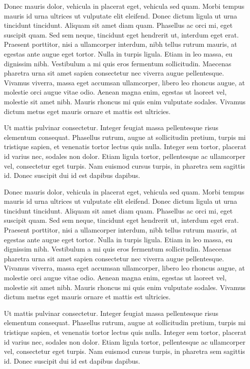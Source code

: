 \documentclass{FramateX}
\begin{document}
Donec mauris dolor, vehicula in placerat eget, vehicula sed quam. Morbi tempus mauris id urna ultrices ut vulputate elit eleifend. Donec dictum ligula ut urna tincidunt tincidunt. Aliquam sit amet diam quam. Phasellus ac orci mi, eget suscipit quam. Sed sem neque, tincidunt eget hendrerit ut, interdum eget erat. Praesent porttitor, nisi a ullamcorper interdum, nibh tellus rutrum mauris, at egestas ante augue eget tortor. Nulla in turpis ligula. Etiam in leo massa, eu dignissim nibh. Vestibulum a mi quis eros fermentum sollicitudin. Maecenas pharetra urna sit amet sapien consectetur nec viverra augue pellentesque. Vivamus viverra, massa eget accumsan ullamcorper, libero leo rhoncus augue, at molestie orci augue vitae odio. Aenean magna enim, egestas ut laoreet vel, molestie sit amet nibh. Mauris rhoncus mi quis enim vulputate sodales. Vivamus dictum metus eget mauris ornare et mattis est ultricies.

Ut mattis pulvinar consectetur. Integer feugiat massa pellentesque risus elementum consequat. Phasellus rutrum, augue at sollicitudin pretium, turpis mi tristique sapien, et venenatis tortor lectus quis nulla. Integer sem tortor, placerat id varius nec, sodales non dolor. Etiam ligula tortor, pellentesque ac ullamcorper vel, consectetur eget turpis. Nam euismod cursus turpis, in pharetra sem sagittis id. Donec suscipit dui id est dapibus dapibus.

Donec mauris dolor, vehicula in placerat eget, vehicula sed quam. Morbi tempus mauris id urna ultrices ut vulputate elit eleifend. Donec dictum ligula ut urna tincidunt tincidunt. Aliquam sit amet diam quam. Phasellus ac orci mi, eget suscipit quam. Sed sem neque, tincidunt eget hendrerit ut, interdum eget erat. Praesent porttitor, nisi a ullamcorper interdum, nibh tellus rutrum mauris, at egestas ante augue eget tortor. Nulla in turpis ligula. Etiam in leo massa, eu dignissim nibh. Vestibulum a mi quis eros fermentum sollicitudin. Maecenas pharetra urna sit amet sapien consectetur nec viverra augue pellentesque. Vivamus viverra, massa eget accumsan ullamcorper, libero leo rhoncus augue, at molestie orci augue vitae odio. Aenean magna enim, egestas ut laoreet vel, molestie sit amet nibh. Mauris rhoncus mi quis enim vulputate sodales. Vivamus dictum metus eget mauris ornare et mattis est ultricies.


Ut mattis pulvinar consectetur. Integer feugiat massa pellentesque risus elementum consequat. Phasellus rutrum, augue at sollicitudin pretium, turpis mi tristique sapien, et venenatis tortor lectus quis nulla. Integer sem tortor, placerat id varius nec, sodales non dolor. Etiam ligula tortor, pellentesque ac ullamcorper vel, consectetur eget turpis. Nam euismod cursus turpis, in pharetra sem sagittis id. Donec suscipit dui id est dapibus dapibus.
\end{document}
